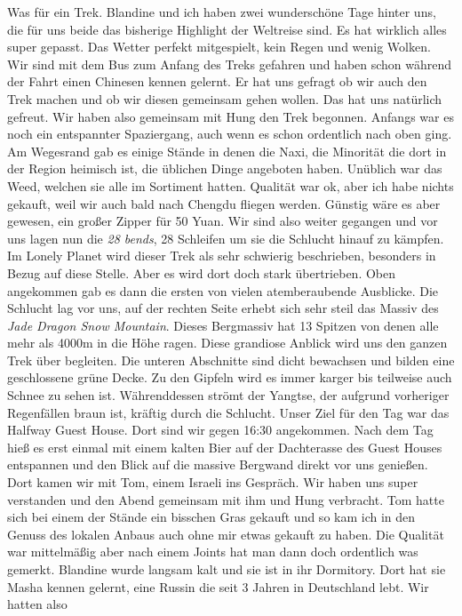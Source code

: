 \documentclass[11pt]{book}
\begin{document}
Was für ein Trek. Blandine und ich haben zwei wunderschöne Tage hinter uns, die für uns beide das bisherige Highlight 
der Weltreise sind. Es hat wirklich alles super gepasst. Das Wetter perfekt mitgespielt, kein Regen und wenig 
Wolken. Wir sind mit dem Bus zum Anfang des Treks gefahren und haben schon während der Fahrt einen Chinesen 
kennen gelernt. Er hat uns gefragt ob wir auch den Trek machen und ob wir diesen gemeinsam gehen wollen. Das hat 
uns natürlich gefreut. Wir haben also gemeinsam mit Hung den Trek begonnen. Anfangs war es noch ein entspannter 
Spaziergang, auch wenn es schon ordentlich nach oben ging. Am Wegesrand gab es einige Stände in denen die Naxi,
die Minorität die dort in der Region heimisch ist, die üblichen Dinge angeboten haben. Unüblich war das Weed, 
welchen sie alle im Sortiment hatten. Qualität war ok, aber ich habe nichts gekauft, weil wir auch bald nach 
Chengdu fliegen werden. Günstig wäre es aber gewesen, ein großer Zipper für 50 Yuan. Wir sind also weiter gegangen
und vor uns lagen nun die \emph{28 bends}, 28 Schleifen um sie die Schlucht hinauf zu kämpfen. Im Lonely Planet
wird dieser Trek als sehr schwierig beschrieben, besonders in Bezug auf diese Stelle. Aber es wird dort doch stark 
übertrieben. Oben angekommen gab es dann die ersten von vielen atemberaubende Ausblicke. Die Schlucht lag vor uns,
auf der rechten Seite erhebt sich sehr steil das Massiv des \emph{Jade Dragon Snow Mountain}. Dieses Bergmassiv 
hat 13 Spitzen von denen alle mehr als 4000m in die Höhe ragen. Diese grandiose Anblick wird uns den ganzen Trek 
über begleiten. Die unteren Abschnitte sind dicht bewachsen und bilden eine geschlossene grüne Decke. Zu den Gipfeln
wird es immer karger bis teilweise auch Schnee zu sehen ist. Währenddessen strömt der Yangtse, der aufgrund vorheriger 
Regenfällen braun ist, kräftig durch die Schlucht. 
Unser Ziel für den Tag war das Halfway Guest House. Dort sind wir gegen 16:30 angekommen. Nach dem Tag hieß es 
erst einmal mit einem kalten Bier auf der Dachterasse des Guest Houses entspannen und den Blick auf die massive
Bergwand direkt vor uns genießen. Dort kamen wir mit Tom, einem Israeli ins Gespräch. Wir haben uns super verstanden 
und den Abend gemeinsam mit ihm und Hung verbracht. Tom hatte sich bei einem der Stände ein bisschen Gras gekauft
und so kam ich in den Genuss des lokalen Anbaus auch ohne mir etwas gekauft zu haben. Die Qualität war mittelmäßig 
aber nach einem Joints hat man dann doch ordentlich was gemerkt. Blandine wurde langsam kalt und sie ist in ihr 
Dormitory. Dort hat sie Masha kennen gelernt, eine Russin die seit 3 Jahren in Deutschland lebt. Wir hatten also 
\end{document}
